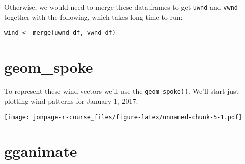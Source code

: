 \documentclass[]{book}
\newenvironment{Shaded}{\begin{snugshade}}{\end{snugshade}}
\newcommand{\KeywordTok}[1]{\textcolor[rgb]{0.13,0.29,0.53}{\textbf{{#1}}}}
\newcommand{\DataTypeTok}[1]{\textcolor[rgb]{0.13,0.29,0.53}{{#1}}}
\newcommand{\DecValTok}[1]{\textcolor[rgb]{0.00,0.00,0.81}{{#1}}}
\newcommand{\StringTok}[1]{\textcolor[rgb]{0.31,0.60,0.02}{{#1}}}
\newcommand{\NormalTok}[1]{{#1}}
\begin{document}
Otherwise, we would need to merge these data.frames to get \texttt{uwnd}
and \texttt{vwnd} together with the following, which takes long time to
run:

\begin{verbatim}
wind <- merge(uwnd_df, vwnd_df)
\end{verbatim}

\section{geom\_spoke}\label{geom_spoke}

To represent these wind vectors we'll use the \texttt{geom\_spoke()}.
We'll start just plotting wind patterns for January 1, 2017:

\begin{Shaded}
\end{Shaded}

\texttt{[image: jonpage-r-course\_files/figure-latex/unnamed-chunk-5-1.pdf]}

\section{gganimate}\label{gganimate}
\end{document}
